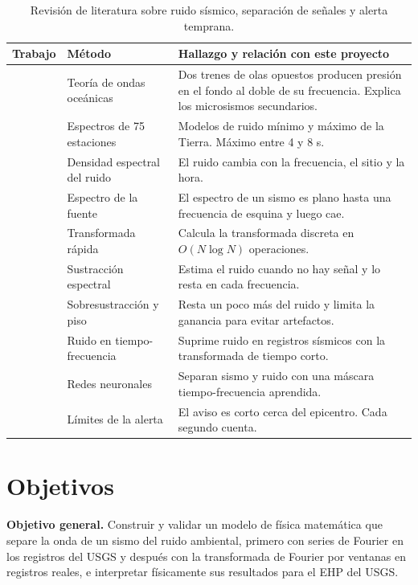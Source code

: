 \documentclass[11pt,letterpaper]{article}
\begin{document}
\begin{table}[H]
\centering
\small
\begin{tabularx}{\textwidth}{>{\raggedright\arraybackslash}p{3.2cm}>{\raggedright\arraybackslash}p{3.3cm}X}
\toprule
Trabajo & Método & Hallazgo y relación con este proyecto\\
\midrule
\textcite{longuet1950} & Teoría de ondas oceánicas & Dos trenes de olas opuestos producen presión en el fondo al doble de su frecuencia. Explica los microsismos secundarios.\\
\textcite{peterson1993} & Espectros de 75 estaciones & Modelos de ruido mínimo y máximo de la Tierra. Máximo entre 4 y 8 s.\\
\textcite{mcnamara2004} & Densidad espectral del ruido & El ruido cambia con la frecuencia, el sitio y la hora.\\
\textcite{brune1970} & Espectro de la fuente & El espectro de un sismo es plano hasta una frecuencia de esquina y luego cae.\\
\textcite{cooley1965} & Transformada rápida & Calcula la transformada discreta en $O(N\log N)$ operaciones.\\
\textcite{boll1979} & Sustracción espectral & Estima el ruido cuando no hay señal y lo resta en cada frecuencia.\\
\textcite{berouti1979} & Sobresustracción y piso & Resta un poco más del ruido y limita la ganancia para evitar artefactos.\\
\textcite{mousavi2016} & Ruido en tiempo-frecuencia & Suprime ruido en registros sísmicos con la transformada de tiempo corto.\\
\textcite{zhu2019} & Redes neuronales & Separan sismo y ruido con una máscara tiempo-frecuencia aprendida.\\
\textcite{minson2018} & Límites de la alerta & El aviso es corto cerca del epicentro. Cada segundo cuenta.\\
\bottomrule
\end{tabularx}
\caption{Revisión de literatura sobre ruido sísmico, separación de señales y alerta temprana.}
\label{tab:arte}
\end{table}

\section{Objetivos}
\textbf{Objetivo general.} Construir y validar un modelo de física matemática que separe la onda de un sismo del ruido ambiental, primero con series de Fourier en los registros del USGS y después con la transformada de Fourier por ventanas en registros reales, e interpretar físicamente sus resultados para el EHP del USGS.
\end{document}
